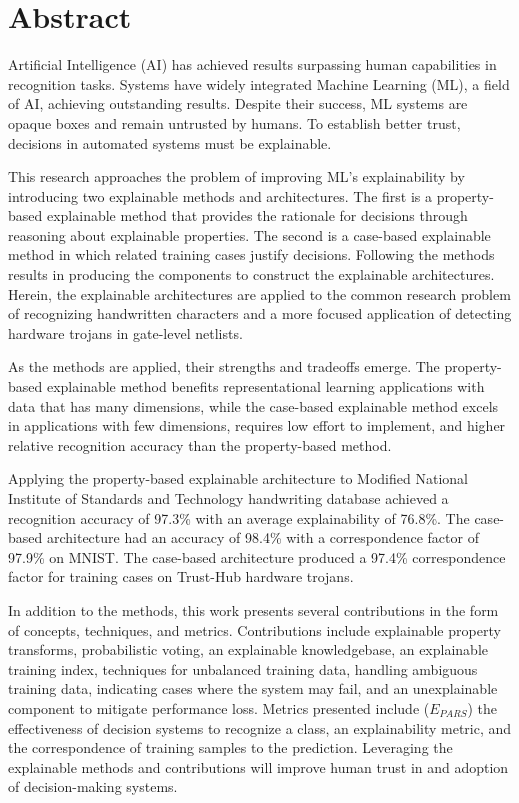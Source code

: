 \chapter*{Abstract}{
\pagestyle{plain} %

Artificial Intelligence (AI) has achieved results surpassing human capabilities
in recognition tasks. Systems have widely integrated Machine Learning (ML), a
field of AI, achieving outstanding results. Despite their success, ML systems
are opaque boxes and remain untrusted by humans. To establish better trust,
decisions in automated systems must be explainable.

This research approaches the problem of improving ML's explainability by
introducing two explainable methods and architectures. The first is a
property-based explainable method that provides the rationale for decisions
through reasoning about explainable properties. The second is a case-based
explainable method in which related training cases justify decisions. Following
the methods results in producing the components to construct the explainable
architectures. Herein, the explainable architectures are applied to the common
research problem of recognizing handwritten characters and a more focused
application of detecting hardware trojans in gate-level netlists.

As the methods are applied, their strengths and tradeoffs emerge. The
property-based explainable method benefits representational learning
applications with data that has many dimensions, while the case-based
explainable method excels in applications with few dimensions, requires low
effort to implement, and higher relative recognition accuracy than the
property-based method.

Applying the property-based explainable architecture to Modified National
Institute of Standards and Technology handwriting database achieved a
recognition accuracy of 97.3\% with an average explainability of 76.8\%. The
case-based architecture had an accuracy of 98.4\% with a correspondence factor
of 97.9\% on MNIST. The case-based architecture produced a 97.4\% correspondence
factor for training cases on Trust-Hub hardware trojans.

In addition to the methods, this work presents several contributions in the form
of concepts, techniques, and metrics. Contributions include explainable property
transforms, probabilistic voting, an explainable knowledgebase, an explainable
training index, techniques for unbalanced training data, handling ambiguous
training data, indicating cases where the system may fail, and an unexplainable
component to mitigate performance loss. Metrics presented include ($E_{PARS}$)
the effectiveness of decision systems to recognize a class, an explainability
metric, and the correspondence of training samples to the prediction. Leveraging
the explainable methods and contributions will improve human trust in and
adoption of decision-making systems.

\thispagestyle{plain} %
}

